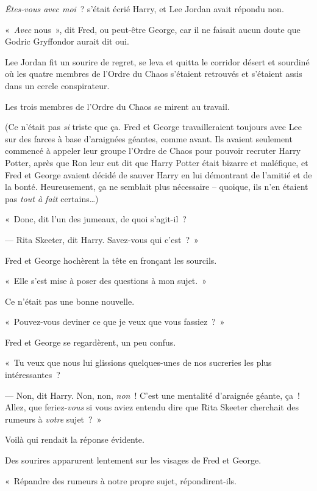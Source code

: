 \emph{Êtes-vous avec moi}~? s'était écrié Harry, et Lee Jordan avait répondu non.

«~\emph{Avec} nous~», dit Fred, ou peut-être George, car il ne faisait aucun doute que Godric Gryffondor aurait dit oui.

Lee Jordan fit un sourire de regret, se leva et quitta le corridor désert et sourdiné où les quatre membres de l'Ordre du Chaos s'étaient retrouvés et s'étaient assis dans un cercle conspirateur.

Les trois membres de l'Ordre du Chaos se mirent au travail.

(Ce n'était pas \emph{si} triste que ça. Fred et George travailleraient toujours avec Lee sur des farces à base d'araignées géantes, comme avant. Ils avaient seulement commencé à appeler leur groupe l'Ordre de Chaos pour pouvoir recruter Harry Potter, après que Ron leur eut dit que Harry Potter était bizarre et maléfique, et Fred et George avaient décidé de sauver Harry en lui démontrant de l'amitié et de la bonté. Heureusement, ça ne semblait plus nécessaire -- quoique, ils n'en étaient pas \emph{tout à fait} certains…)

«~Donc, dit l'un des jumeaux, de quoi s'agit-il~?

--- Rita Skeeter, dit Harry. Savez-vous qui c'est~?~»

Fred et George hochèrent la tête en fronçant les sourcils.

«~Elle s'est mise à poser des questions à mon sujet.~»

Ce n'était pas une bonne nouvelle.

«~Pouvez-vous deviner ce que je veux que vous fassiez~?~»

Fred et George se regardèrent, un peu confus.

«~Tu veux que nous lui glissions quelques-unes de nos sucreries les plus intéressantes~?

--- Non, dit Harry. Non, non, \emph{non}~! C'est une mentalité d'araignée géante, ça~! Allez, que feriez-\emph{vous} si vous aviez entendu dire que Rita Skeeter cherchait des rumeurs à \emph{votre} sujet~?~»

Voilà qui rendait la réponse évidente.

Des sourires apparurent lentement sur les visages de Fred et George.

«~Répandre des rumeurs à notre propre sujet, répondirent-ils.

